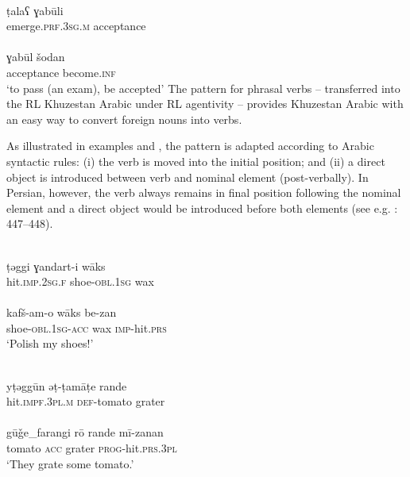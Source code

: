 \documentclass[output=paper,nonflat]{langsci/langscibook}
\begin{document}
\ea\label{ex:key:} \label{tala}
\\
\gll ṭalaʕ ɣabūli\footnotemark \\
     emerge.\textsc{prf}.3\textsc{sg}.\textsc{m} acceptance\\
\\
\gll ɣabūl šodan\\
     acceptance become.\textsc{inf} \\
\glt ‘to pass (an exam), be accepted’
\z\z
{}
The pattern for phrasal verbs – transferred into the RL Khuzestan Arabic under RL agentivity – provides Khuzestan Arabic with an easy way to convert foreign nouns into verbs.

As illustrated in examples  and , the pattern is adapted according to Arabic syntactic rules: (i) the verb is moved into the initial position; and (ii) a direct object is introduced between verb and nominal element (post-verbally). In Persian, however, the verb always remains in final position following the nominal element and a direct object would be introduced before both elements (see e.g. \citealt{Majidi1990}: 447–448).

\ea\label{ex:key:} \label{taggi}
\\
\gll ṭəggi ɣandart-i wāks\\
     hit.\textsc{imp.2sg.f} shoe-\textsc{obl}.1\textsc{sg} wax\\
 
\\
\gll kafš-am-o wāks be-zan\\
     shoe-\textsc{obl.}1\textsc{sg-acc} wax \textsc{imp-}hit\textsc{.prs}\\
\glt ‘Polish my shoes!’
\z\z

\ea\label{ex:key:} \label{tamate}
\\
\gll yṭəggūn əṭ-ṭamāṭe rande\\
     hit.\textsc{impf.3pl.m} \textsc{def}{}-tomato grater \\
 
\\
\gll gūǧe\_farangi rō rande mī-zanan\\
     tomato \textsc{acc} grater \textsc{prog}-hit\textsc{.prs.3pl} \\
\glt ‘They grate some tomato.’
\z\z
\end{document}
